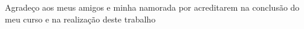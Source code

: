 Agradeço aos meus amigos e minha namorada por acreditarem na conclusão do meu curso e na realização deste trabalho